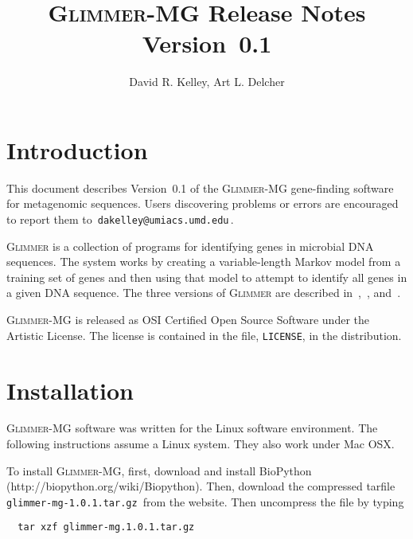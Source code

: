 \documentclass[fleqn,titlepage,11pt]{article}
\def\Glimmer{\textsc{Glimmer}}
\def\Gmg{\textsc{Glimmer-MG}}
\def\Pg#1{\texttt{#1}}
\begin{document}
\RaggedRight
\sloppy

\title{\Gmg{} Release Notes \\ Version~0.1}
\author{David R. Kelley, Art L. Delcher}

\maketitle

\section{Introduction}

This document describes Version~0.1 of the \Gmg{} gene-finding
software for metagenomic sequences.  Users discovering problems or
errors are encouraged to report them to
\,\verb`dakelley@umiacs.umd.edu`\,.

\Glimmer{} is a collection of programs for identifying genes in
microbial DNA sequences.  The system works by creating a
variable-length Markov model from a training set of genes and then
using that model to attempt to identify all genes in a given DNA
sequence.  The three versions of \Glimmer{} are described
in~\cite{glimmer1},~\cite{glimmer2}, and~\cite{glimmer3}.

\Gmg{} is released as OSI Certified Open Source Software under the
Artistic License.  The license is contained in the file, \Pg{LICENSE},
in the distribution.

\section{Installation}

\Gmg{} software was written for the Linux software environment.  The
following instructions assume a Linux system.  They also work under
Mac OSX.

To install \Gmg{}, first, download and install BioPython
(http://biopython.org/wiki/Biopython). Then, download the compressed
tarfile \,\verb`glimmer-mg-1.0.1.tar.gz`\, from the website.  Then
uncompress the file by typing \BSV
\begin{verbatim}
  tar xzf glimmer-mg.1.0.1.tar.gz
\end{verbatim}
\ESV
\end{document}
